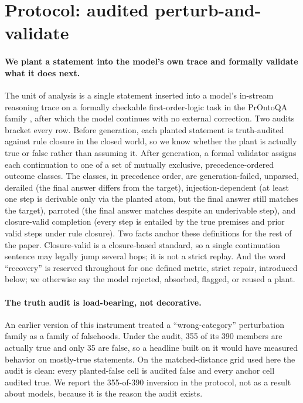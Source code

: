 \section{Protocol: audited perturb-and-validate}
\label{sec:protocol}


\paragraph{We plant a statement into the model's own trace and formally
validate what it does next.} The unit of analysis is a single statement
inserted into a model's in-stream reasoning trace on a formally checkable
first-order-logic task in the PrOntoQA family \citep{saparov2023prontoqa,
saparov2023ood}, after which the model continues with no external
correction. Two audits bracket every row. Before generation, each planted
statement is truth-audited against rule closure in the closed world, so we
know whether the plant is actually true or false rather than assuming it.
After generation, a formal validator assigns each continuation to one of a
set of mutually exclusive, precedence-ordered outcome classes. The classes,
in precedence order, are generation-failed, unparsed, derailed (the final
answer differs from the target), injection-dependent (at least one step is
derivable only via the planted atom, but the final answer still matches the
target), parroted (the final answer matches despite an underivable step),
and closure-valid completion (every step is entailed by the true premises
and prior valid steps under rule closure).
Two facts anchor these definitions for the rest of the paper.
Closure-valid is a closure-based standard, so a single continuation
sentence may legally jump several hops; it is not a strict replay. And the
word ``recovery'' is reserved throughout for one defined metric, strict
repair, introduced below; we otherwise say the model rejected, absorbed,
flagged, or reused a plant.

\paragraph{The truth audit is load-bearing, not decorative.} An earlier
version of this instrument treated a ``wrong-category'' perturbation family
as a family of falsehoods. Under the audit, 355 of its 390 members are
actually true and only 35 are false, so a headline built on it would have
measured behavior on mostly-true statements.
On the matched-distance grid used here the audit is clean: every
planted-false cell is audited false and every anchor cell audited true.
We report the 355-of-390 inversion in the protocol, not as a result about
models, because it is the reason the audit exists.

